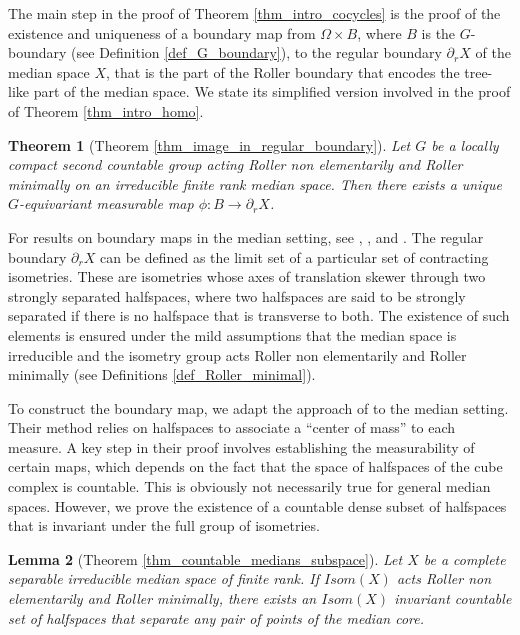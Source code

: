 \documentclass{amsart}
\numberwithin{equation}{section}
\newtheorem{theorem}{Theorem}
\newtheorem{lemma}[theorem]{Lemma}
\theoremstyle{definition}
\begin{document}
 
 
 The main step in the proof of Theorem \ref{thm_intro_cocycles} is the proof of the existence and uniqueness of a boundary map from $\Omega \times B$, where $B$ is the $G$-boundary (see Definition \ref{def_G_boundary}), to the regular boundary $\partial_r X$ of the median space $X$, that is the part of the Roller boundary that encodes the tree-like part of the median space. We state its simplified version involved in the proof of Theorem \ref{thm_intro_homo}.
 
 \begin{theorem}[Theorem \ref{thm_image_in_regular_boundary}]
 Let $G$ be a locally compact second countable group acting Roller non elementarily and Roller minimally on an irreducible finite rank median space. Then there exists a unique $G$-equivariant measurable map $\phi:B\rightarrow \partial_r X$.
 \end{theorem}
For results on boundary maps in the median setting, see \cite{ChaIF}, \cite{Fernos}, \cite{Sageev-Nevo} and \cite{Bader-Taller}.
 The regular boundary $\partial_r X$ can be defined as the limit set of a particular set of contracting isometries. These are isometries whose axes of translation skewer through two strongly separated halfspaces, where two halfspaces are said to be strongly separated if there is no halfspace that is transverse to both. The existence of such elements is ensured under the mild assumptions that the median space is irreducible and the isometry group acts Roller non elementarily and Roller minimally (see Definitions \ref{def_Roller_minimal}).

 \par 

To construct the boundary map, we adapt the approach of \cite{ChaIF} to the median setting. Their method relies on halfspaces to associate a “center of mass” to each measure. A key step in their proof involves establishing the measurability of certain maps, which depends on the fact that the space of halfspaces of the cube complex is countable. This is obviously not necessarily true for general median spaces. However, we prove the existence of a countable dense subset of halfspaces that is invariant under the full group of isometries.
\begin{lemma}[Theorem \ref{thm_countable_medians_subspace}]\label{thm_fundamental_family_introduction}
Let $X$ be a complete separable irreducible median space of finite rank. If $Isom(X)$ acts Roller non elementarily and Roller minimally, there exists an $Isom(X)$ invariant countable set of halfspaces that separate any pair of points of the median core.

\end{lemma}
\end{document}
